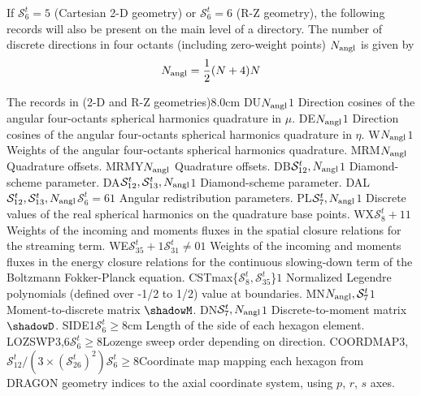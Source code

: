 If $\mathcal{S}^{t}_{6}=5$ (Cartesian 2-D geometry) or $\mathcal{S}^{t}_{6}=6$ (R-Z geometry), the following records will also be present on the main level of a 
directory. The number of discrete directions in four octants (including zero-weight points) $N_{\rm angl}$ is given by
$$
N_{\rm angl}={1\over 2}(N+4)N
$$

\begin{DescriptionEnregistrement}{The  records in
 (2-D and R-Z geometries)}{8.0cm}
\RealEnr
  {DU}{$N_{\rm angl}$}{$1$}
  {Direction cosines of the angular four-octants spherical harmonics quadrature in $\mu$.} 
\RealEnr
  {DE}{$N_{\rm angl}$}{$1$}
  {Direction cosines of the angular four-octants spherical harmonics quadrature in $\eta$.} 
\RealEnr
  {W}{$N_{\rm angl}$}{$1$}
  {Weights of the angular four-octants spherical harmonics quadrature.} 
\IntEnr
  {MRM}{$N_{\rm angl}$}
  {Quadrature offsets.} 
\IntEnr
  {MRMY}{$N_{\rm angl}$}
  {Quadrature offsets.} 
\RealEnr
  {DB}{$\mathcal{S}^{t}_{12},N_{\rm angl}$}{$1$}
  {Diamond-scheme parameter.} 
\RealEnr
  {DA}{$\mathcal{S}^{t}_{12},\mathcal{S}^{t}_{13},N_{\rm angl}$}{$1$}
  {Diamond-scheme parameter.} 
\OptRealEnr
  {DAL}{$\mathcal{S}^{t}_{12},\mathcal{S}^{t}_{13},N_{\rm angl}$}{$\mathcal{S}^{t}_{6}=6$}{$1$}
  {Angular redistribution parameters.} 
\RealEnr
  {PL}{$\mathcal{S}^{t}_{7},N_{\rm angl}$}{$1$}
  {Discrete values of the real spherical harmonics on the quadrature base points.} 
\RealEnr
  {WX}{$\mathcal{S}^{t}_{8}+1$}{$1$}
  {Weights of the incoming and moments fluxes in the spatial closure relations for the streaming term.}
\OptRealEnr
  {WE}{$\mathcal{S}^{t}_{35}+1$}{$\mathcal{S}^{t}_{31}\neq0$}{$1$}
  {Weights of the incoming and moments fluxes in the energy closure relations for the continuous slowing-down term of the Boltzmann Fokker-Planck equation.}
\RealEnr
  {CST}{max\{$\mathcal{S}^{t}_{8},\mathcal{S}^{t}_{35}$\}}{$1$}
  {Normalized Legendre polynomials (defined over -1/2 to 1/2) value at boundaries.}
\RealEnr
  {MN}{$N_{\rm angl},\mathcal{S}^{t}_{7}$}{$1$}
  {Moment-to-discrete matrix $\shadowM$.} 
\RealEnr
  {DN}{$\mathcal{S}^{t}_{7},N_{\rm angl}$}{$1$}
  {Discrete-to-moment matrix $\shadowD$.} 
\OptRealEnr
  {SIDE}{1}{$\mathcal{S}^{t}_{6}\geq8$}{cm}
  {Length of the side of each hexagon element.} 
\OptIntEnr
  {LOZSWP}{3,6}{$\mathcal{S}^{t}_{6}\geq8$}{Lozenge sweep order depending on direction.} 
\OptIntEnr
  {COORDMAP}{3,$\mathcal{S}^{t}_{12}/(3\times(\mathcal{S}^{t}_{26})^2)$}{$\mathcal{S}^{t}_{6}\geq8$}{Coordinate map mapping each hexagon from DRAGON geometry indices to the axial coordinate system, using $p$, $r$, $s$ axes.} 
\end{DescriptionEnregistrement}

